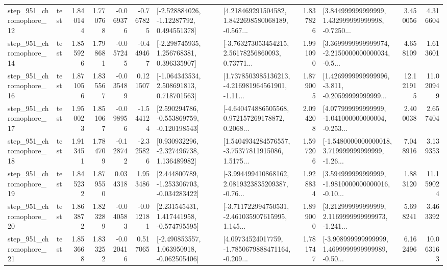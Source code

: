 \begin{tabular}{llrrrrllrlrr}
  step\_951\_chromophore\_12 &      test &      1.840144 &    1.770768 &     -0.069376 & -0.767825 &    [-2.528884026, -1.12287792, 0.494551378] &  [4.218469291504582, 1.8422698580068189, -0.567... &       1.837826 &  [3.844999999999999, 1.432999999999998, -0.7250... &            3.450056 &          4.316604 \\
  step\_951\_chromophore\_14 &      test &      1.855926 &    1.798681 &     -0.057245 & -0.449467 &    [-2.298745935, 1.256768381, 0.396335907] &  [-3.763273053454215, 2.56178256860093, 0.73771... &       1.991090 &  [3.3699999999999974, -2.2150000000000034, -0.5... &            4.658109 &          1.613601 \\
  step\_951\_chromophore\_16 &      test &      1.871056 &    1.835567 &     -0.035489 &  0.121507 &    [-1.064343534, 2.508691813, 0.718701563] &  [1.7378503985136213, -4.216981964561901, -1.11... &       1.879005 &  [1.4269999999999996, -3.811, -0.20599999999999... &           12.121915 &         11.020949 \\
  step\_951\_chromophore\_17 &      test &      1.950023 &    1.851067 &     -0.098956 & -1.544124 &   [2.590294786, -0.553869759, -0.120198543] &  [-4.640474886505568, 0.972157269178872, 0.2068... &       2.094208 &  [4.077999999999999, -1.041000000000004, -0.253... &            2.400038 &          2.657404 \\
  step\_951\_chromophore\_18 &      test &      1.913451 &    1.784709 &     -0.128742 & -2.325826 &    [0.930932296, -2.327496738, 1.136489982] &  [1.5404934284576557, -3.75377811915086, 1.5175... &       1.597206 &  [-1.5480000000000018, 3.719999999999999, -1.26... &            7.048916 &          3.139353 \\
  step\_951\_chromophore\_19 &      test &      1.845232 &    1.879550 &      0.034318 &  1.953486 &   [2.444800789, -1.253306703, -0.034283422] &  [-3.994499410868162, 2.0819323835209387, -0.76... &       1.928834 &  [3.594999999999999, -1.9810000000000016, -0.10... &            1.883120 &         11.159024 \\
  step\_951\_chromophore\_20 &      test &      1.863872 &    1.823289 &     -0.040583 & -0.012181 &    [2.231545431, 1.417441958, -0.574795595] &  [-3.711722994750531, -2.461035907615995, 1.145... &       1.899000 &  [3.212999999999999, 2.1169999999999973, -1.241... &            5.698241 &          3.463392 \\
  step\_951\_chromophore\_21 &      test &      1.853668 &    1.833252 &     -0.020416 &  0.517065 &   [-2.490853557, 1.063950918, -0.062505406] &  [4.09734524017759, -1.7850679888471164, -0.209... &       1.781747 &  [-3.908999999999999, 1.4699999999999989, -0.50... &            6.162496 &         10.063163 \\

\end{tabular}
